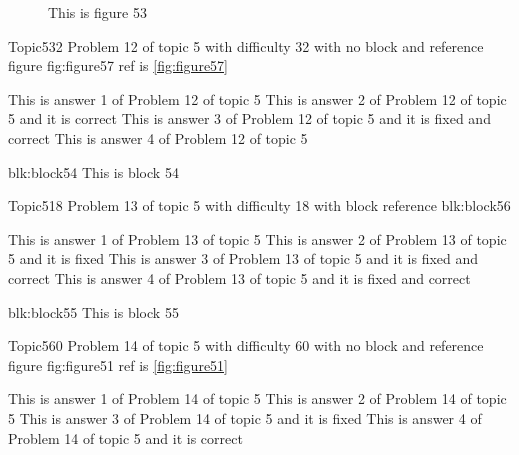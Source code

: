\documentclass[master]{exam}
\begin{document}
\begin{figure}
	\begin{center}
		This is figure 53 
		\label{fig:figure53}
	\end{center}
\end{figure}

\begin{problem}{Topic5}{32}
	Problem 12 of topic 5 with difficulty 32 with no block and reference figure fig:figure57 ref is \ref{fig:figure57}
	\begin{answers}
		\answer This is answer 1 of Problem 12 of topic 5 
		\answer[correct] This is answer 2 of Problem 12 of topic 5 and it is correct
		 This is answer 3 of Problem 12 of topic 5 and it is fixed and correct
		\answer This is answer 4 of Problem 12 of topic 5 
	\end{answers}
\end{problem}



\begin{block}{blk:block54}
This is block 54
\end{block}


\begin{problem}[requires=blk:block56]{Topic5}{18}
	Problem 13 of topic 5 with difficulty 18 with block reference blk:block56
	\begin{answers}
		\answer This is answer 1 of Problem 13 of topic 5 
		\answer[fixed] This is answer 2 of Problem 13 of topic 5 and it is fixed
		 This is answer 3 of Problem 13 of topic 5 and it is fixed and correct
		 This is answer 4 of Problem 13 of topic 5 and it is fixed and correct
	\end{answers}
\end{problem}



\begin{block}{blk:block55}
This is block 55
\end{block}


\begin{problem}{Topic5}{60}
	Problem 14 of topic 5 with difficulty 60 with no block and reference figure fig:figure51 ref is \ref{fig:figure51}
	\begin{answers}
		\answer This is answer 1 of Problem 14 of topic 5 
		\answer This is answer 2 of Problem 14 of topic 5 
		\answer[fixed] This is answer 3 of Problem 14 of topic 5 and it is fixed
		\answer[correct] This is answer 4 of Problem 14 of topic 5 and it is correct
	\end{answers}
\end{problem}
\end{document}
